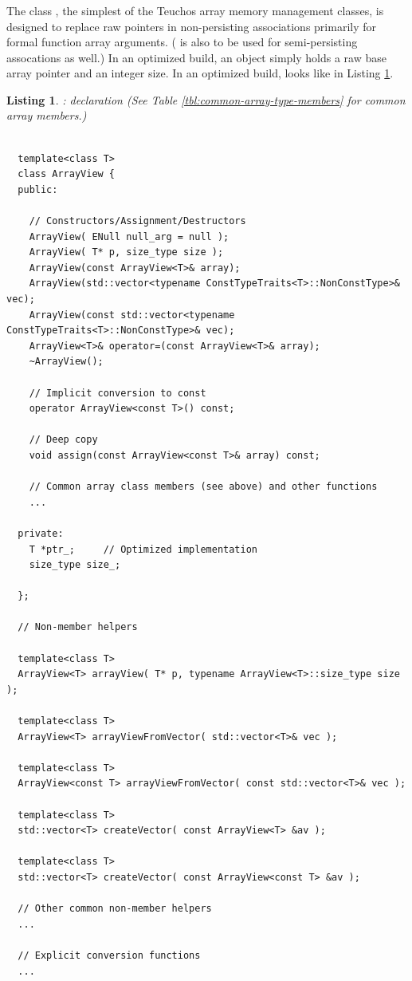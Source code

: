 \documentclass[pdf,ps2pdf,11pt]{SANDreport}
\newtheorem{listing}{Listing}
\begin{document}
%
{}\subsubsection{}
\label{sec:ArrayView}
%

The class {}, the simplest of the Teuchos array
memory management classes, is designed to replace raw pointers in
non-persisting associations primarily for formal function array
arguments.  ({} is also to be used for semi-persisting
assocations as well.)  In an optimized build, an {}
object simply holds a raw base array pointer and an integer size.  In
an optimized build, {} looks like in Listing
{}\ref{listing:ArrayView}.

{}\begin{listing}: {} declaration (See
Table {}\ref{tbl:common-array-type-members} for common array members.)
\label{listing:ArrayView}
{\small\begin{verbatim}

  template<class T>
  class ArrayView {
  public:

    // Constructors/Assignment/Destructors
    ArrayView( ENull null_arg = null );
    ArrayView( T* p, size_type size );
    ArrayView(const ArrayView<T>& array);
    ArrayView(std::vector<typename ConstTypeTraits<T>::NonConstType>& vec);
    ArrayView(const std::vector<typename ConstTypeTraits<T>::NonConstType>& vec);
    ArrayView<T>& operator=(const ArrayView<T>& array);
    ~ArrayView();

    // Implicit conversion to const
    operator ArrayView<const T>() const;

    // Deep copy  
    void assign(const ArrayView<const T>& array) const;

    // Common array class members (see above) and other functions
    ...

  private:
    T *ptr_;     // Optimized implementation
    size_type size_;

  };

  // Non-member helpers

  template<class T>
  ArrayView<T> arrayView( T* p, typename ArrayView<T>::size_type size );

  template<class T>
  ArrayView<T> arrayViewFromVector( std::vector<T>& vec );

  template<class T>
  ArrayView<const T> arrayViewFromVector( const std::vector<T>& vec );

  template<class T>
  std::vector<T> createVector( const ArrayView<T> &av );

  template<class T>
  std::vector<T> createVector( const ArrayView<const T> &av );

  // Other common non-member helpers
  ...

  // Explicit conversion functions
  ...

\end{verbatim}}
\end{listing}
\end{document}
